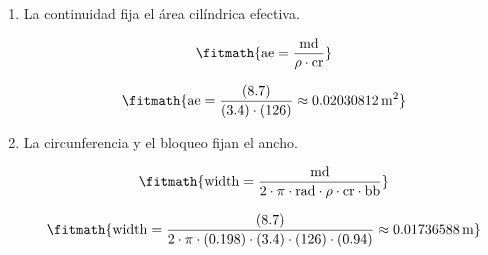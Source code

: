 \begin{enumerate}

\item La continuidad fija el área cilíndrica efectiva.

\[\fitmath{\mathrm{ae}=\frac{\mathrm{md}}{\rho\cdot \mathrm{cr}}}\]

\[\fitmath{\mathrm{ae}=\frac{(8.7)}{(3.4)\cdot (126)}\approx 0.02030812\,\mathrm{m^{2}}}\]

\item La circunferencia y el bloqueo fijan el ancho.

\[\fitmath{\mathrm{width}=\frac{\mathrm{md}}{2\cdot \pi\cdot \mathrm{rad}\cdot \rho\cdot \mathrm{cr}\cdot \mathrm{bb}}}\]

\[\fitmath{\mathrm{width}=\frac{(8.7)}{2\cdot \pi\cdot (0.198)\cdot (3.4)\cdot (126)\cdot (0.94)}\approx 0.01736588\,\mathrm{m}}\]

\end{enumerate}
